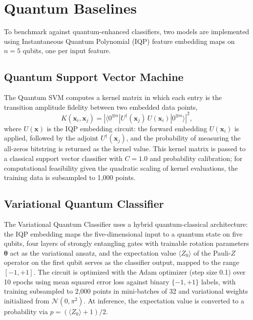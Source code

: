 \documentclass[12pt, a4paper]{report}
\begin{document}
\section{Quantum Baselines}\label{sec:quantum}
To benchmark against quantum-enhanced classifiers, two models are implemented using Instantaneous Quantum Polynomial (IQP) feature embedding maps on $n = 5$ qubits, one per input feature.

\subsection{Quantum Support Vector Machine}
The Quantum SVM computes a kernel matrix in which each entry is the transition amplitude fidelity between two embedded data points,
\begin{equation}
    K(\mathbf{x}_i, \mathbf{x}_j) = \left|\langle 0^{\otimes n} | U^\dagger(\mathbf{x}_j)\, U(\mathbf{x}_i) | 0^{\otimes n} \rangle\right|^2,
\end{equation}
where $U(\mathbf{x})$ is the IQP embedding circuit: the forward embedding $U(\mathbf{x}_i)$ is applied, followed by the adjoint $U^\dagger(\mathbf{x}_j)$, and the probability of measuring the all-zeros bitstring is returned as the kernel value. This kernel matrix is passed to a classical support vector classifier with $C = 1.0$ and probability calibration; for computational feasibility given the quadratic scaling of kernel evaluations, the training data is subsampled to 1{,}000 points.

\subsection{Variational Quantum Classifier}
The Variational Quantum Classifier uses a hybrid quantum-classical architecture: the IQP embedding maps the five-dimensional input to a quantum state on five qubits, four layers of strongly entangling gates with trainable rotation parameters $\boldsymbol{\theta}$ act as the variational ansatz, and the expectation value $\langle Z_0 \rangle$ of the Pauli-$Z$ operator on the first qubit serves as the classifier output, mapped to the range $[-1, +1]$. The circuit is optimized with the Adam optimizer (step size 0.1) over 10 epochs using mean squared error loss against binary $\{-1, +1\}$ labels, with training subsampled to 2{,}000 points in mini-batches of 32 and variational weights initialized from $\mathcal{N}(0, \pi^2)$. At inference, the expectation value is converted to a probability via $p = (\langle Z_0 \rangle + 1) / 2$.
\end{document}
